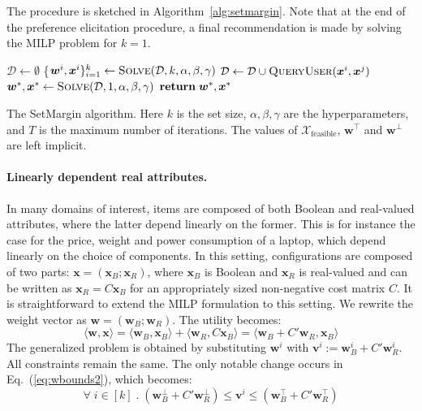 \documentclass{article}
\renewcommand\[{\begin{equation}}
\renewcommand\]{\end{equation}}
\newcommand{\calvar}[1]{\ensuremath{\mathcal{#1}}}
\newcommand{\calD}{\calvar{D}}
\newcommand{\calX}{\calvar{X}}
\newcommand{\vecvar}[1]{\ensuremath{\boldsymbol{#1}}}
\newcommand{\vv}{\vecvar{v}}
\newcommand{\vw}{\vecvar{w}}
\newcommand{\vx}{\vecvar{x}}
\begin{document}
The procedure is sketched in
Algorithm~\ref{alg:setmargin}. Note that at the end of the preference
elicitation procedure, a final recommendation is made by solving the
MILP problem for $k=1$.

\begin{algorithm}[t]
{\footnotesize
\begin{algorithmic}[1]
        \State $\calD \gets \emptyset$
            \State \{$\vw^{i}, \vx^{i}\}_{i=1}^k \gets \text{{\sc Solve}}(\calD, k, \alpha, \beta, \gamma)$
            \For{$\vx^{i},\vx^{j} \in \{ \vx^{1}, \ldots, \vx^{k} \} \; \text{{\bf s.t.}} \; i < j$}
                \State $\calD \gets \calD \cup \text{{\sc QueryUser}}(\vx^{i},\vx^{j})$
            \EndFor
        \EndFor
        \State $\vw^*, \vx^* \gets \text{{\sc Solve}}(\calD, 1, \alpha, \beta, \gamma)$
        \State ${\bf return}\; \vw^*, \vx^*$
    \EndProcedure
\end{algorithmic}
}
\caption{\label{alg:setmargin} The {\sc SetMargin} algorithm. Here $k$ is the
set size, $\alpha,\beta,\gamma$ are the hyperparameters, and $T$ is the maximum
number of iterations. The values of $\calX_\text{feasible}$, $\vw^\top$ and
$\vw^\bot$ are left implicit.}
\end{algorithm}

\paragraph{Linearly dependent real attributes.} In many domains of
interest, items are composed of both Boolean and real-valued
attributes, where the latter depend linearly on the former. This is
for instance the case for the price, weight and power consumption of a
laptop, which depend linearly on the choice of components.  In
this setting, %
configurations are composed of two parts:
$\vx = (\vx_B;\vx_R)$, where $\vx_B$ is Boolean and $\vx_R$ is
real-valued and can be written as $\vx_R = C \vx_B$ for an
appropriately sized non-negative cost matrix $C$.  It is
straightforward to extend the MILP formulation to this setting. %
We rewrite the weight vector as $\vw = (\vw_B;\vw_R)$. The utility
becomes:
%
$$ \langle \vw, \vx \rangle = \langle \vw_B, \vx_B \rangle + \langle \vw_R, C \vx_B \rangle = \langle \vw_B + C' \vw_R, \vx_B \rangle $$
%
The generalized problem is obtained by substituting $\vw^i$ with $\vv^i :=
\vw_B^i + C' \vw_R^i$.  All constraints remain the same. The only notable
change occurs in Eq.~(\ref{eq:wbounds2}), which becomes:
%
$$ \forall \; i \in [k] \;.\; (\vw_B^\bot + C' \vw_R^\bot) \le \vv^i \le (\vw_B^\top + C' \vw_R^\top)$$
%
\end{document}
